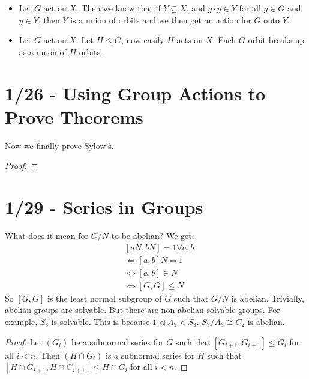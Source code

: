 \documentclass{report}
\begin{document}
\begin{itemize}
    \item Let $G$ act on $X$. Then we know that if $Y \subseteq X$, and $g \cdot y \in Y$ for all $g \in G$ and $y \in Y$, then $Y$ is a union of orbits and we then get an action for $G$ onto $Y$.
    \item Let $G$ act on $X$. Let $H \leq G$, now easily $H$ acts on $X$. Each $G$-orbit breaks up as a union of $H$-orbits.
\end{itemize}
\newpage
\section{1/26 - Using Group Actions to Prove Theorems}
Now we finally prove Sylow's.
\begin{proof}
    
\end{proof}

\section{1/29 - Series in Groups}
\noindent What does it mean for $G/N$ to be abelian? We get:
\begin{align*}
    &[aN, bN] = 1 \forall a ,b \\
    &\iff [a,b]N = 1 \\
    &\iff [a,b] \in N \\
    &\iff [G,G] \leq N
\end{align*}
So $[G, G]$ is the least normal subgroup of $G$ such that $G/N$ is abelian.
Trivially, abelian groups are solvable. But there are non-abelian solvable groups. For example, $S_3$ is solvable. This is because $1 \lhd A_3 \lhd S_3$. $S_3/A_3 \cong C_2$ is abelian.
\newpage
{}
\begin{proof}
    Let $(G_i)$ be a subnormal series for $G$ such that $[G_{i+1}, G_{i+1}] \leq G_i$ for all $i < n$. Then $(H \cap G_i)$ is a subnormal series for $H$ such that $[H \cap G_{i+1}, H \cap G_{i+1}] \leq H \cap G_i$ for all $i < n$.
\end{proof}
\end{document}
